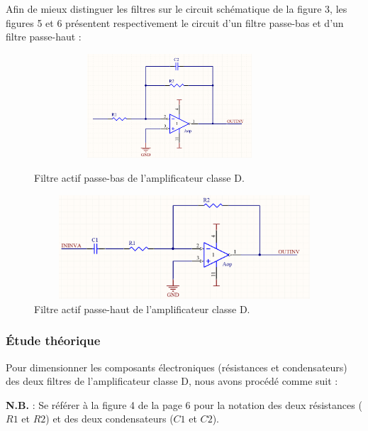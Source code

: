 \documentclass[10pt, oneside, a4paper]{article}
\begin{document}
Afin de mieux distinguer les filtres sur le circuit schématique de la figure 3, les figures 5 et 6 présentent respectivement le circuit d'un filtre passe-bas et d'un filtre passe-haut : 

\begin{figure}
    \centering
    \begin{minipage}[c]{.46\linewidth}
        \includegraphics[height=110pt, width=0.9\textwidth]{eps/Filtre_passe_bas.jpg}
        \caption{Filtre actif passe-bas de l'amplificateur classe D.}   
    \end{minipage} \hfill
    \begin{minipage}[c]{.46\linewidth}
        \includegraphics[height=110pt, width=1.1\textwidth]{eps/Filtre_passe_haut.jpg}
        \caption{Filtre actif passe-haut de l'amplificateur classe D.}    
    \end{minipage}
    \label{fig:classeD}
\end{figure}



\newpage
\subsubsection{Étude théorique}

Pour dimensionner les composants électroniques (résistances et condensateurs) des deux filtres de l'amplificateur classe D, nous avons procédé comme suit : 

\textbf{N.B.} : Se référer à la figure 4 de la page 6 pour la notation des deux résistances ($R1$ et $R2$) et des deux condensateurs ($C1$ et $C2$).
\end{document}
